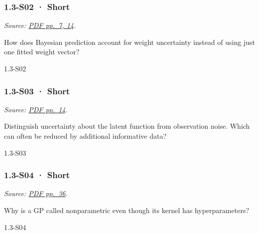 \noindent\begin{minipage}{\linewidth}

\subsubsection{1.3-S02 · Short}\label{s02-short-2}

\emph{Source:
\href{../Lecture\%20Slides/1.3.\%20Bayesian\%20Learning.pdf\#page=7}{PDF
pp.~7, 14}.}

How does Bayesian prediction account for weight uncertainty instead of
using just one fitted weight vector?

\begin{solution}[20mm]{1.3-S02}

\end{solution}
\end{minipage}\par\medskip

\noindent\begin{minipage}{\linewidth}

\subsubsection{1.3-S03 · Short}\label{s03-short-2}

\emph{Source:
\href{../Lecture\%20Slides/1.3.\%20Bayesian\%20Learning.pdf\#page=14}{PDF
pp.~14}.}

Distinguish uncertainty about the latent function from observation
noise. Which can often be reduced by additional informative data?

\begin{solution}[20mm]{1.3-S03}

\end{solution}
\end{minipage}\par\medskip

\noindent\begin{minipage}{\linewidth}

\subsubsection{1.3-S04 · Short}\label{s04-short-2}

\emph{Source:
\href{../Lecture\%20Slides/1.3.\%20Bayesian\%20Learning.pdf\#page=36}{PDF
pp.~36}.}

Why is a GP called nonparametric even though its kernel has
hyperparameters?

\begin{solution}[20mm]{1.3-S04}

\end{solution}
\end{minipage}\par\medskip

